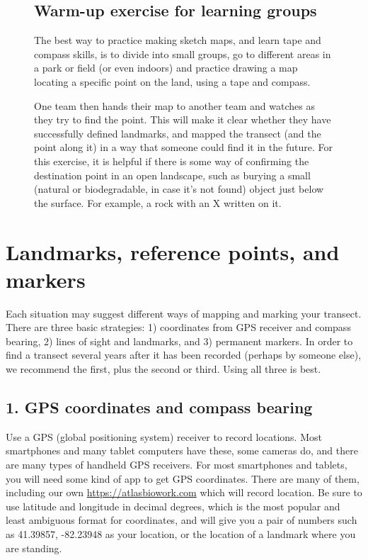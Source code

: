 \documentclass[11pt,letterpaper,twoside,onecolumn]{memoir}
\begin{document}
\begin{figure}
\begin{tcolorbox}
\setlength{\parskip}{1em}
\subsection{Warm-up exercise for learning groups} 

The best way to practice making sketch maps, and learn tape and compass skills, is to divide into small groups, go to different areas in a park or field (or even indoors) and practice drawing a map locating a specific point on the land, using a tape and compass.

One team then hands their map to another team and watches as they try to find the point. This will make it clear whether they have successfully defined landmarks, and mapped the transect (and the point along it) in a way that someone could find it in the future. For this exercise, it is helpful if there is some way of confirming the destination point in an open landscape, such as burying a small (natural or biodegradable, in case it's not found) object just below the surface.  For example, a rock with an X written on it. 
\end{tcolorbox}
\end{figure}


\section*{Landmarks, reference points, and markers}

Each situation may suggest different ways of mapping and marking your transect. There are three basic strategies: 1) coordinates from GPS receiver and compass bearing, 2) lines of sight and landmarks, and 3) permanent markers. In order to find a transect several years after it has been recorded (perhaps by someone else), we recommend the first, plus the second or third. Using all three is best.

\subsection*{1. GPS coordinates and compass bearing}

Use a GPS (global positioning system) receiver to record locations. Most smartphones and many tablet computers have these, some cameras do, and there are many types of handheld GPS receivers. For most smartphones and tablets, you will need some kind of app to get GPS coordinates. There are many of them, including our own \url{https://atlasbiowork.com} which will record location. Be sure to use latitude and longitude in decimal degrees, which is the most popular and least ambiguous format for coordinates, and will give you a pair of numbers such as 41.39857, -82.23948 as your location, or the location of a landmark where you are standing.
\end{document}
